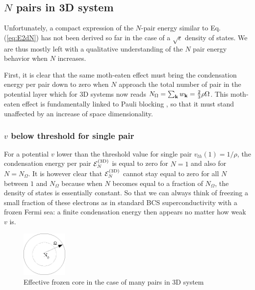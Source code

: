 \documentclass[aps,prb,showpacs,3p,twocolumn]{elsarticle}
\begin{document}
\subsection{$N$ pairs in 3D system}
Unfortunately, a  compact expression of the $N$-pair energy similar to Eq. (\ref{eq:E2dN}) has not been derived so far in the case of a $\sqrt{\epsilon}$ density of states. We are thus mostly left with a qualitative understanding of the $N$ pair energy  behavior when $N$ increases. 

First, it is clear that the same moth-eaten effect must bring the condensation energy per pair down to zero when $N$ approach the total number of pair in the potential layer which for 3D systems now reads $N_\Omega=\sum_{\mathbf{k}}w_{\mathbf{k}}=\frac{2}{3}\rho\Omega$. This moth-eaten effect is fundamentally linked to  Pauli blocking , so that it must stand unaffected by an increase of space dimensionality. 

\subsubsection{$v$ below threshold for single pair}
For a potential $v$ lower than the threshold value for single pair $v_{th}(1)=1/\rho$, the condensation energy per pair $\mathcal{E}_N^{{\text{(3D)}}}$ is equal to zero for $N=1$ and also for $N=N_\Omega$.  It is however clear that $\mathcal{E}_N^{{\text{(3D)}}}$ cannot stay equal to zero for all $N$ between $1$ and $N_\Omega$ because when $N$ becomes equal to a fraction of $N_\Omega$, the density of states is essentially constant.  So that we can always think of  freezing a small fraction of these electrons as in standard BCS superconductivity with a frozen Fermi sea: a finite condensation energy then  appears no matter how weak $v$ is. 

\begin{figure}[htb]
	\centering
		\includegraphics[width=0.20\textwidth]{potential.eps}
	\caption{Effective frozen core in the case of many pairs in 3D system}
	\label{fig:potential}
\end{figure}
\end{document}
